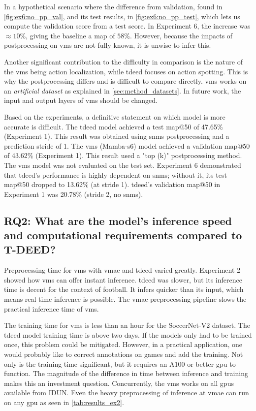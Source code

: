 In a hypothetical scenario where the difference from validation, found in \cref{fig:ex6:no_pp_val}, and its test results, in \cref{fig:ex6:no_pp_test}, which lets us compute the validation score from a test score. In Experiment 6, the increase was \(\approx10\%\), giving the baseline a \acrshort{map} of $58\%$. However, because the impacts of postprocessing on \acrshort{vms} are not fully known, it is unwise to infer this.


Another significant contribution to the difficulty in comparison is the nature of the \acrshort{vms} being action localization, while \acrshort{tdeed} focuses on action spotting. This is why the postprocessing differs and is difficult to compare directly. \acrshort{vms} works on an \textit{artificial dataset} as explained in \cref{sec:method_datasets}. In future work, the input and output layers of \acrshort{vms} should be changed. 

Based on the experiments, a definitive statement on which model is more accurate is difficult. The \acrshort{tdeed} model achieved a test \acrshort{map}@50 of 47.65\% (Experiment 1). This result was obtained using \acrfull{snms} postprocessing and a prediction stride of 1. The \acrshort{vms} (Mamba-\acrshort{s6}) model achieved a validation \acrshort{map}@50 of 43.62\% (Experiment 1). This result used a "top (k)" postprocessing method. The \acrshort{vms} model was not evaluated on the test set. Experiment 6 demonstrated that \acrshort{tdeed}'s performance is highly dependent on \acrshort{snms}; without it, its test \acrshort{map}@50 dropped to 13.62\% (at stride 1). \acrshort{tdeed}'s validation \acrshort{map}@50 in Experiment 1 was 20.78\% (stride 2, no \acrshort{snms}).


\subsection{RQ2: What are the model’s inference speed and computational requirements compared to T-DEED?}

Preprocessing time for \acrshort{vms} with \acrshort{vmae} and \acrshort{tdeed} varied greatly. Experiment 2 showed how \acrshort{vms} can offer instant inference. \acrshort{tdeed} was slower, but its inference time is decent for the context of football. It infers quicker than its input, which means real-time inference is possible. The \acrshort{vmae} preprocessing pipeline slows the practical inference time of \acrshort{vms}. 

The training time for \acrshort{vms} is less than an hour for the SoccerNet-V2 dataset. The \acrshort{tdeed} model training time is above two days. If the models only had to be trained once, this problem could be mitigated. However, in a practical application, one would probably like to correct annotations on games and add the training. Not only is the training time significant, but it requires an A100 or better \acrshort{gpu} to function. The magnitude of the difference in time between inference and training makes this an investment question. Concurrently, the \acrshort{vms} works on all \acrshort{gpu}s available from IDUN. Even the heavy preprocessing of inference at \acrshort{vmae} can run on any \acrshort{gpu} as seen in \cref{tab:results_ex2}.



